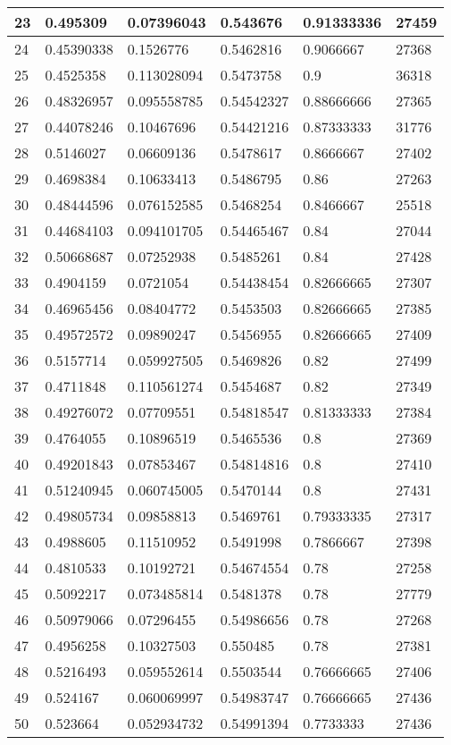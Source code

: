 \begin{longtable}{|l|l|l|l|l|l|}
23 & 0.495309 & 0.07396043 & 0.543676 & 0.91333336 & 27459 \\ \hline 
24 & 0.45390338 & 0.1526776 & 0.5462816 & 0.9066667 & 27368 \\ \hline 
25 & 0.4525358 & 0.113028094 & 0.5473758 & 0.9 & 36318 \\ \hline 
26 & 0.48326957 & 0.095558785 & 0.54542327 & 0.88666666 & 27365 \\ \hline 
27 & 0.44078246 & 0.10467696 & 0.54421216 & 0.87333333 & 31776 \\ \hline 
28 & 0.5146027 & 0.06609136 & 0.5478617 & 0.8666667 & 27402 \\ \hline 
29 & 0.4698384 & 0.10633413 & 0.5486795 & 0.86 & 27263 \\ \hline 
30 & 0.48444596 & 0.076152585 & 0.5468254 & 0.8466667 & 25518 \\ \hline 
31 & 0.44684103 & 0.094101705 & 0.54465467 & 0.84 & 27044 \\ \hline 
32 & 0.50668687 & 0.07252938 & 0.5485261 & 0.84 & 27428 \\ \hline 
33 & 0.4904159 & 0.0721054 & 0.54438454 & 0.82666665 & 27307 \\ \hline 
34 & 0.46965456 & 0.08404772 & 0.5453503 & 0.82666665 & 27385 \\ \hline 
35 & 0.49572572 & 0.09890247 & 0.5456955 & 0.82666665 & 27409 \\ \hline 
36 & 0.5157714 & 0.059927505 & 0.5469826 & 0.82 & 27499 \\ \hline 
37 & 0.4711848 & 0.110561274 & 0.5454687 & 0.82 & 27349 \\ \hline 
38 & 0.49276072 & 0.07709551 & 0.54818547 & 0.81333333 & 27384 \\ \hline 
39 & 0.4764055 & 0.10896519 & 0.5465536 & 0.8 & 27369 \\ \hline 
40 & 0.49201843 & 0.07853467 & 0.54814816 & 0.8 & 27410 \\ \hline 
41 & 0.51240945 & 0.060745005 & 0.5470144 & 0.8 & 27431 \\ \hline 
42 & 0.49805734 & 0.09858813 & 0.5469761 & 0.79333335 & 27317 \\ \hline 
43 & 0.4988605 & 0.11510952 & 0.5491998 & 0.7866667 & 27398 \\ \hline 
44 & 0.4810533 & 0.10192721 & 0.54674554 & 0.78 & 27258 \\ \hline 
45 & 0.5092217 & 0.073485814 & 0.5481378 & 0.78 & 27779 \\ \hline 
46 & 0.50979066 & 0.07296455 & 0.54986656 & 0.78 & 27268 \\ \hline 
47 & 0.4956258 & 0.10327503 & 0.550485 & 0.78 & 27381 \\ \hline 
48 & 0.5216493 & 0.059552614 & 0.5503544 & 0.76666665 & 27406 \\ \hline 
49 & 0.524167 & 0.060069997 & 0.54983747 & 0.76666665 & 27436 \\ \hline 
50 & 0.523664 & 0.052934732 & 0.54991394 & 0.7733333 & 27436 \\ \hline 
\end{longtable}